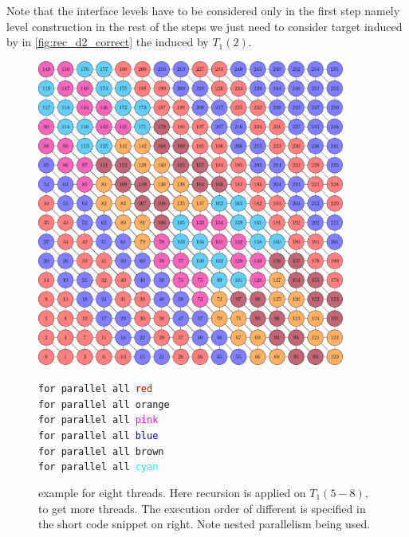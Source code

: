      Note that the interface levels have to be considered only in the first step namely level construction in the rest of the steps we just need to consider target \subgraphs induced by \levelGroups \ie in \cref{fig:rec_d2_correct} the \subgraph induced by $T_1(2)$. 
   
       \begin{figure}[H]
       	\begin{minipage}[c]{0.62\textwidth}
       		\includegraphics[height=0.25\textheight,width=0.9\textwidth]{pics/recursion/2d-7pt_example/2d-7pt/stencil_2d_7pt}
       	\end{minipage}\hfill
       	\begin{minipage}[c]{0.38\textwidth}
       		{\tt for parallel all \textcolor{red}{red}\\
       			\hspace*{1em} for parallel all \textcolor{amber}{orange}\\
       			\hspace*{1em} for parallel all \textcolor{magenta}{pink}\\
       		}
       		{\tt for parallel all \textcolor{blue}{blue}\\
       			\hspace*{1em} for parallel all \textcolor{carmine}{brown}\\
       			\hspace*{1em} for parallel all \textcolor{cyan}{cyan}\\
       		}
       		\caption{\STEX example for eight threads. Here recursion is applied on \levelGroups $T_1(5-8)$, to get more threads. The execution order of different \levelGroup is specified in the short code snippet on right. Note nested parallelism being used.}
       		\label{fig:rec_2d-7pt_graph}
       	\end{minipage}
       \end{figure}
     

